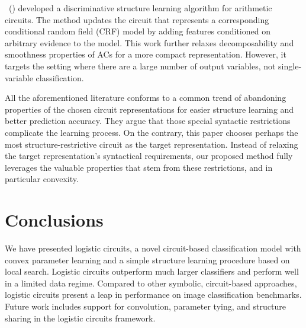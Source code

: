 \documentclass[letterpaper]{article} %
\newcommand{\citet}[1]{\citeauthor{#1}~(\citeyear{#1})}
\begin{document}
\citet{rooshenas2016discriminative} developed a discriminative structure learning algorithm for arithmetic circuits. The method updates the circuit that represents a corresponding conditional random field (CRF) model by adding features conditioned on arbitrary evidence to the model. This work further relaxes decomposability and smoothness properties of ACs for a more compact representation. However, it targets the setting where there are a large number of output variables, not single-variable classification.

All the aforementioned literature conforms to a common trend of abandoning properties of the chosen circuit representations for easier structure learning and better prediction accuracy. They argue that those special syntactic restrictions complicate the learning process. On the contrary, this paper chooses perhaps the most structure-restrictive circuit as the target representation. Instead of relaxing the target representation's syntactical requirements, our proposed method fully leverages the valuable properties that stem from these restrictions, and in particular convexity.

\vspace{-4.17mm}
\section{Conclusions}

We have presented logistic circuits, a novel circuit-based classification model with convex parameter learning and a simple structure learning procedure based on local search. Logistic circuits outperform much larger classifiers and perform well in a limited data regime. Compared to other symbolic, circuit-based approaches, logistic circuits present a leap in performance on image classification benchmarks.
Future work includes support for convolution, parameter tying, and structure sharing in the logistic circuits framework.
\end{document}
